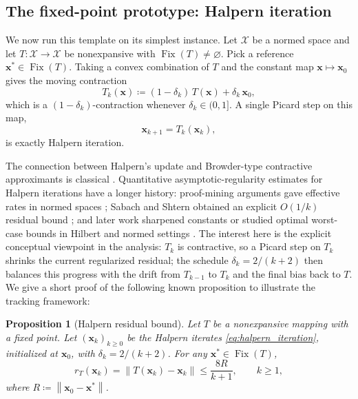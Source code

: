 \documentclass[letterpaper,11pt]{article}
\newcommand{\norm}[1]{\left\| #1 \right\|}
\newcommand{\vect}[1]{\mathbf{#1}}
\newtheorem{proposition}{Proposition}
\begin{document}
\subsection{The fixed-point prototype: Halpern iteration}

We now run this template on its simplest instance. Let \(\mathcal X\) be a
normed space and let \(T \colon \mathcal X \to \mathcal X\) be nonexpansive with
\(\operatorname{Fix}(T)\ne\varnothing\). Pick a reference
\(\vect{x}^*\in\operatorname{Fix}(T)\). Taking a convex combination of \(T\)
and the constant map \(\vect{x}\mapsto\vect{x}_0\) gives the moving contraction
\begin{equation}
\label{eq:regularized_op}
    T_k(\vect{x})
    \coloneqq (1 - \delta_k)\,T(\vect{x}) + \delta_k\,\vect{x}_0,
\end{equation}
which is a \((1-\delta_k)\)-contraction whenever \(\delta_k\in(0,1]\). A single
Picard step on this map,
\begin{equation}
\label{eq:halpern_iteration}
    \vect{x}_{k+1} = T_k(\vect{x}_k),
\end{equation}
is exactly Halpern iteration.

The connection between Halpern's update and Browder-type contractive
approximants is classical
\cite{halpern1967fixed,browder1967convergence,wittmann1992approximation}.
Quantitative asymptotic-regularity estimates for Halpern iterations have a
longer history: proof-mining arguments gave effective rates in normed spaces
\cite{leustean2007rates,kohlenbach2011quantitative}; Sabach and Shtern obtained
an explicit \(O(1/k)\) residual bound \cite{sabach2017first}; and later work
sharpened constants or studied optimal worst-case bounds in Hilbert and normed
settings \cite{lieder2021convergence,park2022exact,contreras2023optimal}. The
interest here is the explicit conceptual viewpoint in the analysis: \(T_k\) is
contractive, so a Picard step on \(T_k\) shrinks the current regularized
residual; the schedule \(\delta_k=2/(k+2)\) then balances this progress with the
drift from \(T_{k-1}\) to \(T_k\) and the final bias back to \(T\). We give a
short proof of the following known proposition to illustrate the tracking
framework:

\begin{proposition}[Halpern residual bound]\label{prop:halpern_residual_bound}
Let \(T\) be a nonexpansive mapping with a fixed point. Let
\((\vect{x}_k)_{k\ge0}\) be the Halpern iterates
\eqref{eq:halpern_iteration}, initialized at \(\vect{x}_0\), with
\(\delta_k=2/(k+2)\). For any \(\vect{x}^*\in\operatorname{Fix}(T)\),
\[
    r_T(\vect{x}_k)
    =
    \norm{T(\vect{x}_k)-\vect{x}_k}
    \le \frac{8R}{k+1},
    \qquad k\ge1,
\]
where \(R\coloneqq\norm{\vect{x}_0-\vect{x}^*}\).
\end{proposition}
\end{document}
